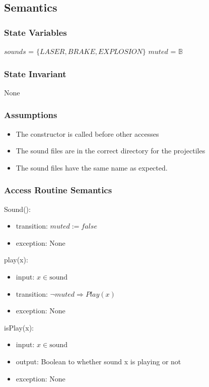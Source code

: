 \documentclass[12pt]{article}
\begin{document}
\subsection* {Semantics}

\subsubsection* {State Variables}

$sounds$ = $\{LASER,BRAKE,EXPLOSION\}$
$muted$ = $\mathbb{B}$

\subsubsection* {State Invariant}

None

\subsubsection* {Assumptions}

\begin{itemize}
    \item The constructor is called before other accesses
    \item The sound files are in the correct directory for the projectiles
    \item The sound files have the same name as expected.
\end{itemize}

\subsubsection* {Access Routine Semantics}

Sound():
\begin{itemize}
  \item transition: $muted := false$
  \item exception: None
\end{itemize}

\noindent play(x):
\begin{itemize}
  \item input: $x \in \mbox{sound}$
  \item transition: $\lnot muted \Rightarrow Play(x)$
  \item exception: None
\end{itemize}

\noindent isPlay(x):
\begin{itemize}
  \item input: $x \in \mbox{sound}$
  \item output: Boolean to whether sound x is playing or not
  \item exception: None
\end{itemize}
\end{document}
